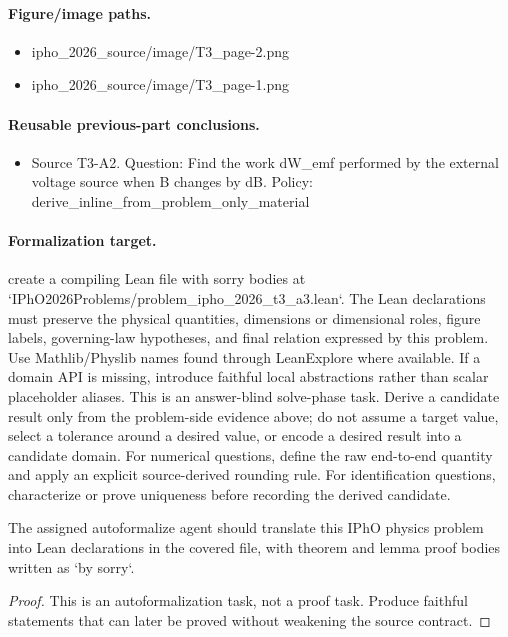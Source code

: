 \paragraph{Figure/image paths.}
\begin{itemize}
\item ipho\_2026\_source/image/T3\_page-2.png
\item ipho\_2026\_source/image/T3\_page-1.png
\end{itemize}

\paragraph{Reusable previous-part conclusions.}
\begin{itemize}
\item Source T3-A2. Question: Find the work dW\_emf performed by the external voltage source when B changes by dB. Policy: derive\_inline\_from\_problem\_only\_material
\end{itemize}

\paragraph{Formalization target.}
create a compiling Lean file with sorry bodies at `IPhO2026Problems/problem\_ipho\_2026\_t3\_a3.lean`.
The Lean declarations must preserve the physical quantities, dimensions or dimensional roles, figure labels, governing-law hypotheses, and final relation expressed by this problem.
Use Mathlib/Physlib names found through LeanExplore where available. If a domain API is missing, introduce faithful local abstractions rather than scalar placeholder aliases.
This is an answer-blind solve-phase task. Derive a candidate result only from the problem-side evidence above; do not assume a target value, select a tolerance around a desired value, or encode a desired result into a candidate domain.
For numerical questions, define the raw end-to-end quantity and apply an explicit source-derived rounding rule. For identification questions, characterize or prove uniqueness before recording the derived candidate.

\begin{theorem}
\label{thm:physics:ipho_2026_t3_a3:target}
The assigned autoformalize agent should translate this IPhO physics problem into Lean declarations in the covered file, with theorem and lemma proof bodies written as `by sorry`.
\end{theorem}
\begin{proof}
This is an autoformalization task, not a proof task. Produce faithful statements that can later be proved without weakening the source contract.
\end{proof}
